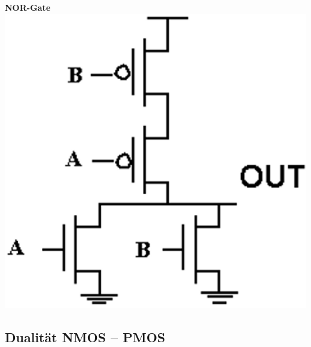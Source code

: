\begin{minipage}[t]{0.38\columnwidth}
    \begin{center}
        \textbf{NOR-Gate} \\
        \includegraphics[width=\columnwidth]{images/cmos_nor.png}
    \end{center}
\end{minipage}


\subsection{Dualität NMOS -- PMOS}

